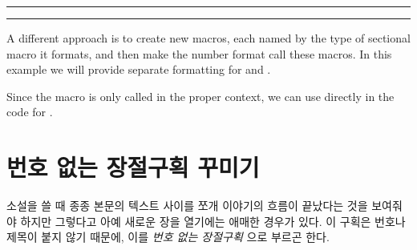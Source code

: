 \fancybreak{$*$}
\fancybreak{}


A different approach is to create new macros, each named by the type
of sectional macro it formats, and then make the number format call
these macros.
In this example we will provide separate formatting for \cmd{\section} and \cmd{\subsection}.
\begin{lcode}
  \newcommand\sectionsecnumformat{\thesection:\quad}
  \newcommand\subsectionsecnumformat{\fbox{\enspace\thesubsection\enspace}\enspace}
\end{lcode}
Since the macro is only called in the proper context, we can use
\cmd{\thesection} directly in the code for \cmd{\section}.







\section{번호 없는 장절구획 꾸미기}


소설을 쓸 때 종종 본문의 텍스트 사이를 쪼개
이야기의 흐름이 끝났다는 것을 보여줘야 하지만
그렇다고 아예 새로운 장을 열기에는 애매한 경우가 있다.
이 구획은 번호나 제목이 붙지 않기 때문에,
이를 \emph{번호 없는 장절구획} 
으로 부르곤 한다.
    
